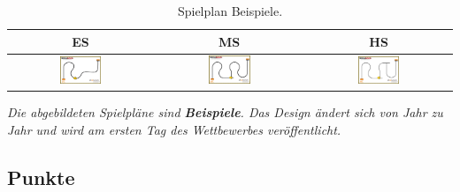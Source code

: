 \documentclass[a4paper,12pt]{article}
\begin{document}
\begin{center}
\begin{table}
	\begin{tabular}{|c|c|c|} \hline
		ES & MS & HS \\
		\hline
\includegraphics[width=0.3\textwidth]{images/cyberspace/linefollowing_es.png}
&
\includegraphics[width=0.3\textwidth]{images/cyberspace/linefollowing_ms.png}
&
\includegraphics[width=0.3\textwidth]{images/cyberspace/linefollowing_hs.png}
\\
    		\hline
	\end{tabular}
\caption{\label{tab:table-name}Spielplan Beispiele.}
\end{table}
\end{center}


\emph{Die abgebildeten Spielpläne sind \textbf{Beispiele}. Das Design ändert sich von Jahr zu
Jahr und wird am ersten Tag des Wettbewerbes veröffentlicht.}

\subsection{Punkte}
\end{document}
